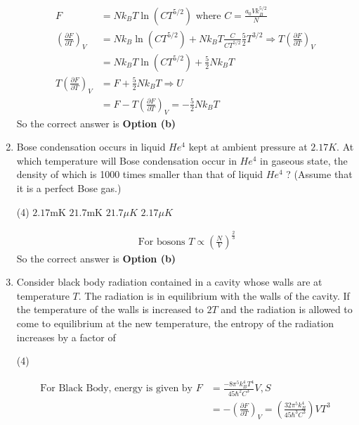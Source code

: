 \begin{enumerate}
\begin{answer}
\begin{align*}
	F&=N k_{B} T \ln \left(C T^{5 / 2}\right)\text{ where }C=\frac{a_{0} V k_{B}^{5 / 2}}{N}\\
	\left(\frac{\partial F}{\partial T}\right)_{V}&=N k_{B} \ln \left(C T^{5 / 2}\right)+N k_{B} T \frac{C}{C T^{5 / 2}} \frac{5}{2} T^{3 / 2} \Rightarrow T\left(\frac{\partial F}{\partial T}\right)_{V}\\&=N k_{B} T \ln \left(C T^{5 / 2}\right)+\frac{5}{2} N k_{B} T\\
	T\left(\frac{\partial F}{\partial T}\right)_{V}&=F+\frac{5}{2} N k_{B} T \Rightarrow U\\&=F-T\left(\frac{\partial F}{\partial T}\right)_{V}=-\frac{5}{2} N k_{B} T
	\end{align*}
	So the correct answer is \textbf{Option (b)}
\end{answer}
	\item Bose condensation occurs in liquid $H e^{4}$ kept at ambient pressure at $2.17 K$. At which temperature will Bose condensation occur in $H e^{4}$ in gaseous state, the density of which is 1000 times smaller than that of liquid $H e^{4}$ ? (Assume that it is a perfect Bose gas.)
	{}
	\begin{tasks}(4)
		\task[\textbf{a.}] $2.17 \mathrm{mK}$
		\task[\textbf{b.}] $21.7 \mathrm{mK}$
		\task[\textbf{c.}] $21.7 \mu K$
		\task[\textbf{d.}] $2.17 \mu K$
	\end{tasks}
\begin{answer}
	\begin{align*}
	\text{	For bosons }T \propto\left(\frac{N}{V}\right)^{\frac{2}{3}}
	\end{align*}
	So the correct answer is \textbf{Option (b)}
\end{answer}
	\item Consider black body radiation contained in a cavity whose walls are at temperature $T$. The radiation is in equilibrium with the walls of the cavity. If the temperature of the walls is increased to $2 T$ and the radiation is allowed to come to equilibrium at the new temperature, the entropy of the radiation increases by a factor of
	{}
	\begin{tasks}(4)
	\end{tasks}
\begin{answer}
	\begin{align*}
	\text{For Black Body, energy is given by }F&=\frac{-8 \pi^{5} k_{B}^{4} T^{4}}{45 \hbar^{2} C^{3}} V, S\\&=-\left(\frac{\partial F}{\partial T}\right)_{V}=\left(\frac{32 \pi^{5} k_{B}^{4}}{45 \hbar^{3} C^{3}}\right) V T^{3}

\end{align*}
\end{answer}
\end{enumerate}
